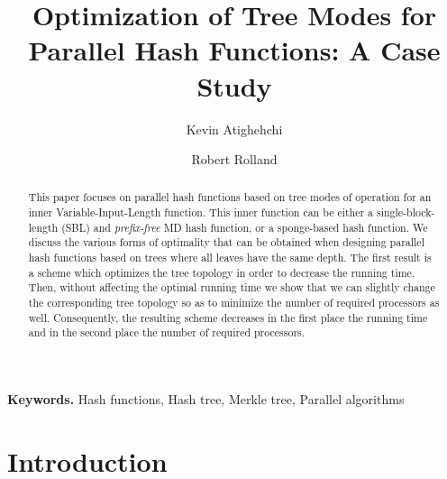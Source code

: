 \documentclass{llncs}
\begin{document}
\title{Optimization of Tree Modes for Parallel Hash Functions: A Case Study}

\author{Kevin Atighehchi \and Robert Rolland}


\maketitle



\begin{abstract} 
This paper focuses on parallel hash functions based on tree modes of operation for an inner Variable-Input-Length function. 
This inner function can be 
either a single-block-length (SBL) and \emph{prefix-free} MD hash function, or a sponge-based hash function. 
We discuss the various forms of optimality that 
can be obtained
when designing parallel hash functions based on trees where all leaves have the same depth.
The first result is a scheme which optimizes 
the tree topology in order to decrease the running time. 
Then, without affecting the optimal running time 
we show that we can slightly change the corresponding tree topology so as 
to minimize the number of required processors as well.
Consequently, the resulting scheme decreases in the first place the running 
time and in the second place the number of required processors. 
\end{abstract}

\smallskip
\noindent \textbf{Keywords.} Hash functions, Hash tree, Merkle tree, Parallel algorithms





\section{Introduction}\label{sec:intro}
\end{document}
